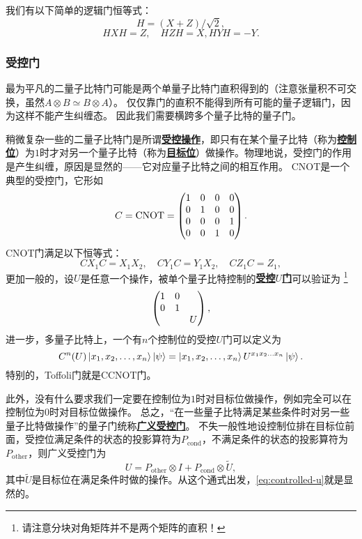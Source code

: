 \documentclass[hyperref, UTF8, a4paper]{ctexart}
\newcommand*{\concept}[1]{\underline{\textbf{#1}}}
\begin{document}
我们有以下简单的逻辑门恒等式：
\begin{equation}
    H = (X + Z) / \sqrt{2},
\end{equation}
\begin{equation}
    H X H = Z, \quad H Z H = X, H Y H = - Y.
\end{equation}

\subsubsection{受控门}

最为平凡的二量子比特门可能是两个单量子比特门直积得到的（注意张量积不可交换，虽然$A \otimes B \simeq B \otimes A$）。
仅仅靠门的直积不能得到所有可能的量子逻辑门，因为这样不能产生纠缠态。
因此我们需要横跨多个量子比特的量子门。

稍微复杂一些的二量子比特门是所谓\concept{受控操作}，即只有在某个量子比特（称为\concept{控制位}）为$1$时才对另一个量子比特（称为\concept{目标位}）做操作。物理地说，受控门的作用是产生纠缠，原因是显然的——它对应量子比特之间的相互作用。
CNOT是一个典型的受控门，它形如
\begin{equation}
    C = \mathrm{CNOT} = \pmqty{1 & 0 & 0 & 0 \\ 0 & 1 & 0 & 0 \\ 0 & 0 & 0 & 1 \\ 0 & 0 & 1 & 0}.
\end{equation}
CNOT门满足以下恒等式：
\begin{equation}
    C X_1 C = X_1 X_2, \quad C Y_1 C = Y_1 X_2, \quad C Z_1 C = Z_1,
\end{equation}
更加一般的，设$U$是任意一个操作，被单个量子比特控制的\concept{受控$U$门}可以验证为%
\footnote{请注意分块对角矩阵并不是两个矩阵的直积！}%
\begin{equation}
    \pmqty{\dmat{1 & 0 \\ 0 & 1, U}},
    \label{eq:controlled-u}
\end{equation}
进一步，多量子比特上，一个有$n$个控制位的受控$U$门可以定义为
\begin{equation}
    C^n(U) \ket{x_1, x_2, \ldots, x_n} \ket{\psi} = \ket{x_1, x_2, \ldots, x_n} U^{x_1 x_2 \ldots x_n} \ket{\psi}.
\end{equation}
特别的，Toffoli门就是CCNOT门。

此外，没有什么要求我们一定要在控制位为$1$时对目标位做操作，例如完全可以在控制位为$0$时对目标位做操作。
总之，“在一些量子比特满足某些条件时对另一些量子比特做操作”的量子门统称\concept{广义受控门}。
不失一般性地设控制位排在目标位前面，受控位满足条件的状态的投影算符为$P_\text{cond}$，不满足条件的状态的投影算符为$P_\text{other}$，则广义受控门为
\begin{equation}
    U = P_\text{other} \otimes I + P_\text{cond} \otimes \tilde{U},
\end{equation}
其中$\tilde{U}$是目标位在满足条件时做的操作。从这个通式出发，\eqref{eq:controlled-u}就是显然的。
\end{document}
